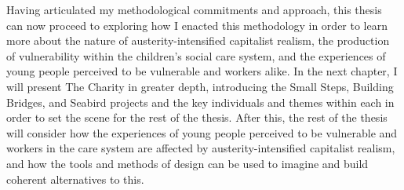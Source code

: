 Having articulated my methodological commitments and approach, this thesis can now proceed to exploring how I enacted this methodology in order to learn more about the nature of austerity-intensified capitalist realism, the production of vulnerability within the children's social care system, and the experiences of young people perceived to be vulnerable and workers alike. In the next chapter, I will present The Charity in greater depth, introducing the Small Steps, Building Bridges, and Seabird projects and the key individuals and themes within each in order to set the scene for the rest of the thesis. After this, the rest of the thesis will consider how the experiences of young people perceived to be vulnerable and workers in the care system are affected by austerity-intensified capitalist realism, and how the tools and methods of design can be used to imagine and build coherent alternatives to this.